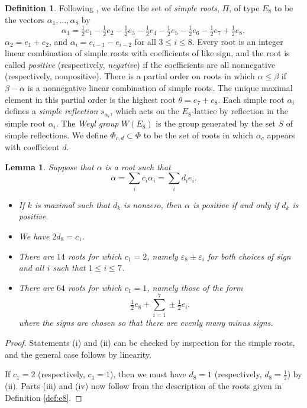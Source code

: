 \documentclass{amsart}
\theoremstyle{plain}
\newtheorem{lemma}[theorem]{Lemma}
\theoremstyle{definition}
\newtheorem{defn}[theorem]{Definition}
\theoremstyle{remark}
\numberwithin{equation}{section}
\newcommand{\al}{\alpha}
\newcommand{\be}{\beta}
\newcommand{\ep}{\varepsilon}
\newcommand{\simproots}{\Pi}
\newcommand{\allroots}{\Phi}
\begin{document}
\begin{defn}
Following \cite[\S2]{humphreys90}, 
we define the set of {\it simple roots}, $\simproots$, of type $E_8$ to be the vectors $\al_1, \ldots, \al_8$ by $$
\al_1 = \tfrac{1}{2}e_1 - \tfrac{1}{2}e_2 - \tfrac{1}{2}e_3 - \tfrac{1}{2}e_4 - \tfrac{1}{2}e_5 - \tfrac{1}{2}e_6 - 
\tfrac{1}{2}e_7 + \tfrac{1}{2}e_8 ,$$ $\al_2 = e_1 + e_2$, and $\al_i = e_{i-1} - e_{i-2}$ for all $3 \leq i \leq 8$.
Every root is an integer linear combination of simple roots with coefficients of like sign, and the root is called
{\it positive} (respectively, {\it negative}) if the coefficients are all nonnegative (respectively, nonpositive).
There is a partial order on roots in which $\al \leq \be$ if $\be - \al$ is a nonnegative linear combination of 
simple roots. The unique maximal element in this partial order is the highest root $\theta = e_7 + e_8$.
Each simple root $\al_i$ defines a {\it simple reflection} $s_{\al_i}$, which acts on the $E_8$-lattice by reflection in the
simple root $\al_i$. The {\it Weyl group} $W(E_8)$ is the group generated by the set $S$ of simple reflections.
We define $\allroots_{c, d} \subset \allroots$ to be the set of roots in which $\alpha_c$ appears with coefficient $d$.
\end{defn}

\begin{lemma}\label{lem:e8}
Suppose that $\al$ is a root such that $$
\al = \sum_i c_i \al_i = \sum_i d_i e_i
.$$ 
\begin{itemize}
\item[{\rm (i)}]{If $k$ is maximal such that $d_k$ is nonzero, then $\al$ is positive if and only if $d_k$ is positive.}
\item[{\rm (ii)}]{We have $2d_8 = c_1$.}
\item[{\rm (iii)}]{There are $14$ roots for which $c_1 = 2$, namely $\ep_8 \pm \ep_i$ for both choices of sign and all
$i$ such that $1 \leq i \leq 7$.}
\item[{\rm (iv)}]{There are $64$ roots for which $c_1 = 1$, namely those of the form $$
\tfrac{1}{2}e_8 + \sum_{i = 1}^7 \pm \tfrac{1}{2}e_i
,$$ where the signs are chosen so that there are evenly many minus signs.}
\end{itemize}
\end{lemma}

\begin{proof}
Statements (i) and (ii) can be checked by inspection for the simple roots, and the general case follows by linearity.

If $c_1 = 2$ (respectively, $c_1 = 1$), then we must have $d_8 = 1$ (respectively, $d_8 = \tfrac{1}{2}$) by (ii). 
Parts (iii) and (iv) now follow from the description of the roots given in Definition \ref{def:e8}.
\end{proof}
\end{document}
